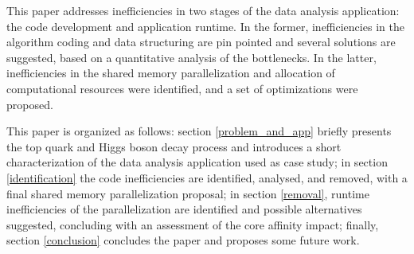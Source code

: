 This paper addresses inefficiencies in two stages of the data analysis application: the code development and application runtime. In the former, inefficiencies in the algorithm coding and data structuring are pin pointed and several solutions are suggested, based on a quantitative analysis of the bottlenecks. In the latter, inefficiencies in the shared memory parallelization and allocation of computational resources were identified, and a set of optimizations were proposed.

This paper is organized as follows: section \ref{problem_and_app} briefly presents the top quark and Higgs boson decay process and introduces a short characterization of the data analysis application used as case study; in section \ref{identification} the code inefficiencies are identified, analysed, and removed, with a final shared memory parallelization proposal; in section \ref{removal}, runtime inefficiencies of the parallelization are identified and possible alternatives suggested, concluding with an assessment of the core affinity impact; finally, section \ref{conclusion} concludes the paper and proposes some future work.

